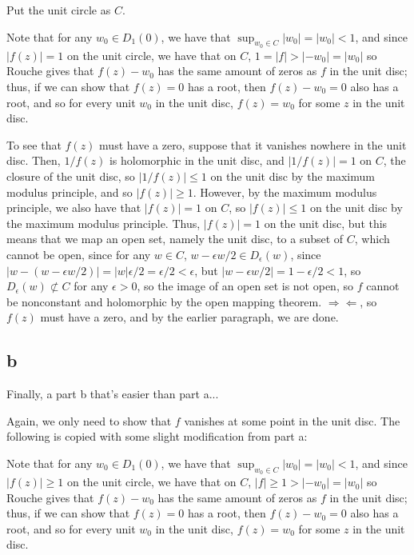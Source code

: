 \documentclass[12pt,letterpaper]{article}
\theoremstyle{definition}
\newcommand{\contra}{\Rightarrow\!\Leftarrow}
\begin{document}
Put the unit circle as $C$.

Note that for any $w_{0} \in D_{1}(0)$, we have that $\sup_{w_{0} \in C}|w_{0}| = |w_{0}| < 1$, and since $|f(z)| = 1$ on the unit circle, we have that on $C$, $1 = |f| > |-w_{0}| = |w_{0}|$ so Rouche gives that $f(z) - w_{0}$ has the same amount of zeros as $f$ in the unit disc; thus, if we can show that $f(z) = 0$ has a root, then $f(z) - w_{0} = 0$ also has a root, and so for every unit $w_{0}$ in the unit disc, $f(z) = w_{0}$ for some $z$ in the unit disc.

To see that $f(z)$ must have a zero, suppose that it vanishes nowhere in the unit disc. Then, $1/f(z)$ is holomorphic in the unit disc, and $|1/f(z)| = 1$ on $C$, the closure of the unit disc, so $|1/f(z)| \leq 1$ on the unit disc by the maximum modulus principle, and so $|f(z)| \geq 1$. However, by the maximum modulus principle, we also have that $|f(z)| = 1$ on $C$, so $|f(z)| \leq 1$ on the unit disc by the maximum modulus principle. Thus, $|f(z)| = 1$ on the unit disc, but this means that we map an open set, namely the unit disc, to a subset of $C$, which cannot be open, since for any $w \in C$, $w - \epsilon w / 2 \in D_{\epsilon}(w)$, since $|w - (w - \epsilon w/ 2)| = |w|\epsilon/2 = \epsilon/2 < \epsilon$, but $|w - \epsilon w/2| = 1 - \epsilon/2 < 1$, so $D_{\epsilon}(w) \not\subset C$ for any $\epsilon > 0$, so the image of an open set is not open, so $f$ cannot be nonconstant and holomorphic by the open mapping theorem. $\contra$, so $f(z)$ must have a zero, and by the earlier paragraph, we are done.

\subsection*{b}

Finally, a part b that's easier than part a...

Again, we only need to show that $f$ vanishes at some point in the unit disc. The following is copied with some slight modification from part a:

Note that for any $w_{0} \in D_{1}(0)$, we have that $\sup_{w_{0} \in C}|w_{0}| = |w_{0}| < 1$, and since $|f(z)| \geq 1$ on the unit circle, we have that on $C$, $|f| \geq 1 > |-w_{0}| = |w_{0}|$ so Rouche gives that $f(z) - w_{0}$ has the same amount of zeros as $f$ in the unit disc; thus, if we can show that $f(z) = 0$ has a root, then $f(z) - w_{0} = 0$ also has a root, and so for every unit $w_{0}$ in the unit disc, $f(z) = w_{0}$ for some $z$ in the unit disc.
\end{document}

